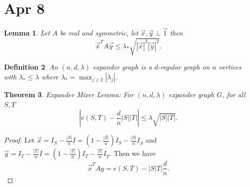 \documentclass[a4paper]{article}
\newtheorem{thm}{Theorem}[section]
\newtheorem{lem}[thm]{Lemma}
\newtheorem{defn}[thm]{Definition}
\begin{document}
\section{Apr 8}
\begin{lem}
    Let $A$ be real and symmetric, let $\vec{x},\vec{y}\perp \vec{1}$ then 
    \[
    \vec{x}^TA\vec{y}\leq \lambda_* \sqrt{|\vec{x}|^2|\vec{y}|^2}
    .\] 
\end{lem}
\begin{defn}
    An $(n,d,\lambda)$ expander graph is a $d$-regular graph on $n$ vertices with $\lambda_*\leq \lambda$ where $\lambda_*=\max_{j\geq 2}|\lambda_j|$. 
\end{defn}
\begin{thm}
    Expander Mixer Lemma: For $(n,d,\lambda)$ expander graph $G$, for all $S,T$ 
    \[
    \left | e(S,T)-\frac{d}{n}|S||T| \right |\leq \lambda \sqrt{|S||T|}
    .\] 
\end{thm}
\begin{proof}
    Let $\vec{x}=I_S-\frac{|S|}{n}I= \left( 1-\frac{|S|}{n} \right)I_S- \frac{|S|}{n}I_{\overline{S}}$ and $\vec{y}=I_T-\frac{|T|}{n}I= \left( 1-\frac{|T|}{n} \right)I_T- \frac{|T|}{n}I_{\overline{T}}$. Then we have 
    \[
    \vec{x}^T A y= e(S,T)-|S|T| \frac{d}{n}
    .\] 

\end{proof}
\newpage
\end{document}
